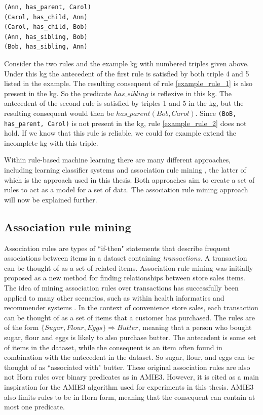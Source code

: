 \begin{example}[A simple KG.]
\begin{lstlisting}[]
(Ann, has_parent, Carol)
(Carol, has_child, Ann)
(Carol, has_child, Bob)
(Ann, has_sibling, Bob)
(Bob, has_sibling, Ann)
\end{lstlisting}
\label{mini_KG_rules}
\end{example}


Consider the two rules and the example \gls{kg} with numbered triples given above. Under this \gls{kg} the antecedent of the first rule is satisfied by both triple 4 and 5 listed in the example. The resulting consequent of rule \ref{example_rule_1} is also present in the \gls{kg}. So the predicate $has\_sibling$ is reflexive in this \gls{kg}. The antecedent of the second rule is satisfied by triples 1 and 5 in the \gls{kg}, but the resulting consequent would then be $has\_parent(Bob, Carol)$. Since \texttt{(BoB, has\_parent, Carol)} is not present in the \gls{kg}, rule \ref{example_rule_2} does not hold. If we know that this rule is reliable, we could for example extend the incomplete \gls{kg} with this triple.

Within rule-based machine learning there are many different approaches, including learning classifier systems \cite{sigaud2007learning} and association rule mining \cite{agrawal1993mining}, the latter of which is the approach used in this thesis. Both approaches aim to create a set of rules to act as a model for a set of data. The association rule mining approach will now be explained further.


\subsection{Association rule mining}
Association rules \cite{agrawal1993mining} are types of ``if-then" statements that describe frequent associations between items in a dataset containing \textit{transactions}. A transaction can be thought of as a set of related items. Association rule mining was initially proposed as a new method for finding relationships between store sales items. The idea of mining association rules over transactions has successfully been applied to many other scenarios, such as within health informatics and recommender systems \cite{altaf2017applications, lin2002efficient}. In the context of convenience store sales, each transaction can be thought of as a set of items that a customer has purchased. The rules are of the form $\{Sugar, Flour, Eggs\} \Rightarrow Butter$, meaning that a person who bought sugar, flour and eggs is likely to also purchase butter. The antecedent is some set of items in the dataset, while the consequent is an item often found in combination with the antecedent in the dataset.  So sugar, flour, and eggs can be thought of as ``associated with" butter. These original association rules are also not Horn rules over binary predicates as in AMIE3. However, it is cited as a main inspiration for the AMIE3 algorithm used for experiments in this thesis. AMIE3 also limits rules to be in Horn form, meaning that the consequent can contain at most one predicate.

